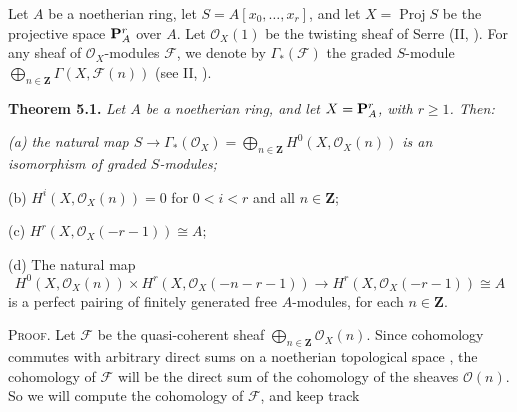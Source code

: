 {Let $A$ be a noetherian ring, let $S=A[x_0,\ldots,x_r]$, and let $X=\operatorname{Proj}S$ be the projective space $\mathbf{P}_A^r$ over $A$. Let $\mathcal O_X(1)$ be the twisting sheaf of Serre (II, ). For any sheaf of $\mathcal O_X$-modules $\mathcal F$, we denote by $\Gamma_*(\mathcal F)$ the graded $S$-module $\bigoplus_{n\in\mathbf Z}\Gamma(X,\mathcal F(n))$ (see II, ).

\smallskip
\noindent\hypertarget{result-III-5.1}{}\textbf{Theorem 5.1.} \emph{Let $A$ be a noetherian ring, and let $X=\mathbf{P}_A^r$, with $r\geq1$. Then:}
\par{\itshape\leftskip=12pt
\hypertarget{result-III-5.1a}{}(a) the natural map $S\to\Gamma_*(\mathcal O_X)=\bigoplus_{n\in\mathbf Z}H^0(X,\mathcal O_X(n))$ is an isomorphism of graded $S$-modules;

\hypertarget{result-III-5.1b}{}(b) $H^i(X,\mathcal O_X(n))=0$ for $0<i<r$ and all $n\in\mathbf Z$;

\hypertarget{result-III-5.1c}{}(c) $H^r(X,\mathcal O_X(-r-1))\cong A$;

\hypertarget{result-III-5.1d}{}(d) The natural map
\[
H^0(X,\mathcal O_X(n))\times H^r(X,\mathcal O_X(-n-r-1))\to H^r(X,\mathcal O_X(-r-1))\cong A
\]
is a perfect pairing of finitely generated free $A$-modules, for each $n\in\mathbf Z$.\par}

\smallskip
\noindent\textsc{Proof.} Let $\mathcal F$ be the quasi-coherent sheaf $\bigoplus_{n\in\mathbf Z}\mathcal O_X(n)$. Since cohomology commutes with arbitrary direct sums on a noetherian topological space , the cohomology of $\mathcal F$ will be the direct sum of the cohomology of the sheaves $\mathcal O(n)$. So we will compute the cohomology of $\mathcal F$, and keep track
}
